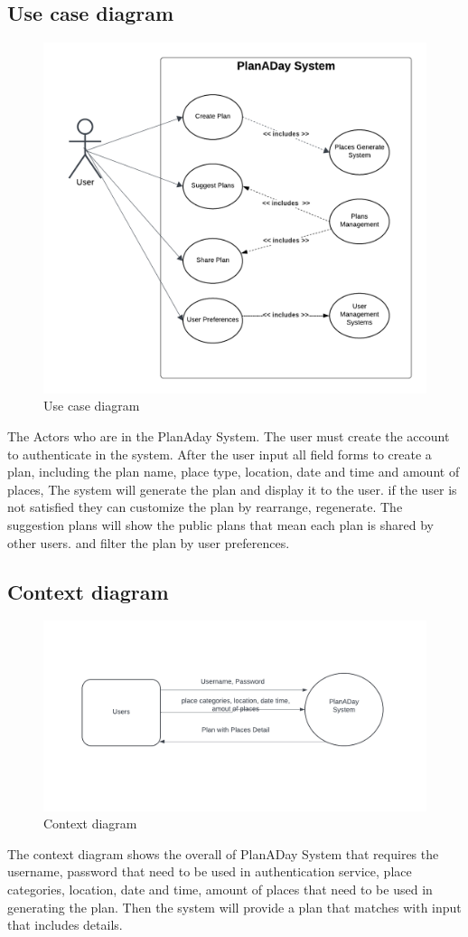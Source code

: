 \subsection{Use case diagram}
\begin{figure}[!h]
    \centering
    \includegraphics[width=0.7\linewidth]{chapter3/use-case-diagram.png}
    \caption{Use case diagram}
    \label{fig:Use case diagram}
\end{figure}
\par
The Actors who are in the PlanAday System. The user must create the account to authenticate in
the system. After the user input all field forms to create a plan, including the plan name, place
type, location, date and time and amount of places, The system will generate the plan and
display it to the user. if the user is not satisfied they can customize the plan by rearrange,
regenerate. The suggestion plans will show the public plans that mean each plan is shared by
other users. and filter the plan by user preferences.
\newpage
\subsection{Context diagram}
\begin{figure}[!h]
    \centering
    \includegraphics[width=1\linewidth]{chapter3/context-diagram.png}
    \caption{Context diagram}
    \label{fig:Context diagram}
\end{figure}
\par
The context diagram shows the overall of PlanADay System that requires the username,
password that need to be used in authentication service, place categories, location, date and time,
amount of places that need to be used in generating the plan. Then the system will provide a plan
that matches with input that includes details.


